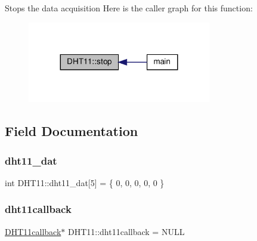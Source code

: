 Stops the data acquisition Here is the caller graph for this function\+:
\nopagebreak
\begin{figure}[H]
\begin{center}
\leavevmode
\includegraphics[width=227pt]{classDHT11_a53188c041b8c49557d328f18ffbdacd7_icgraph}
\end{center}
\end{figure}


\subsection{Field Documentation}
\mbox{\label{classDHT11_aa90815a46d88e84c34f091bf8f208315}} 
\subsubsection{\texorpdfstring{dht11\+\_\+dat}{dht11\_dat}}
{\footnotesize\ttfamily int D\+H\+T11\+::dht11\+\_\+dat\mbox{[}5\mbox{]} = \{ 0, 0, 0, 0, 0 \}\hspace{0.3cm}{\ttfamily [private]}}

\mbox{\label{classDHT11_aebe3e30af75be9b419eb2fde69cfc00d}} 
\subsubsection{\texorpdfstring{dht11callback}{dht11callback}}
{\footnotesize\ttfamily \hyperlink{classDHT11callback}{D\+H\+T11callback}$\ast$ D\+H\+T11\+::dht11callback = N\+U\+LL\hspace{0.3cm}{\ttfamily [private]}}

\mbox{\label{classDHT11_a4d99108d62275d5ccf72df9d17b3211b}} 
